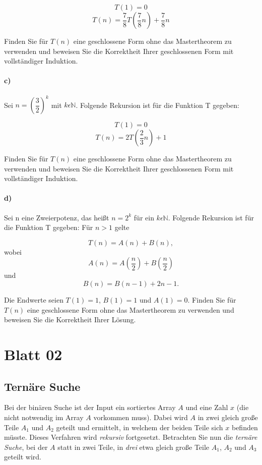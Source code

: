 \documentclass[paper=a4, fontsize=11pt]{scrartcl}
\numberwithin{equation}{section}
\numberwithin{figure}{section}
\numberwithin{table}{section}
\begin{document}
$$T(1)=0$$
$$T(n)= \dfrac{7}{8} T(\dfrac{7}{8} n) + \dfrac{7}{8} n$$

Finden Sie für $T(n)$ eine geschlossene Form ohne das Mastertheorem zu verwenden und beweisen Sie die Korrektheit Ihrer geschlossenen Form mit vollständiger Induktion.

\paragraph{c)}
Sei $n = (\dfrac{3}{2})^{k}$ mit $k \epsilon \mathbb{N}$. Folgende Rekursion ist für die Funktion T gegeben:

$$T(1)=0$$
$$T(n)= 2T ( \dfrac{2}{3} n) + 1$$

Finden Sie für $T(n)$ eine geschlossene Form ohne das Mastertheorem zu verwenden und beweisen Sie die Korrektheit Ihrer geschlossenen Form mit vollständiger Induktion.

\paragraph{d)}
Sei n eine Zweierpotenz, das heißt $n = 2^{k}$ für ein $k \epsilon \mathbb{N}$. Folgende Rekursion ist für die Funktion T gegeben: Für $n > 1$ gelte

$$T(n) = A(n) + B(n) ,$$ wobei
$$A(n)=A(\dfrac{n}{2}) + B( \dfrac{n}{2})$$ und
$$B(n)=B(n-1)

+2n-1.$$

Die Endwerte seien $T(1)=1$, $B(1)=1$ und $A(1)=0$. Finden Sie für $T(n)$ eine geschlossene Form ohne das Mastertheorem zu verwenden und beweisen Sie die Korrektheit Ihrer Lösung.

\newpage
\section{Blatt 02}
\subsection{Ternäre Suche}
Bei der binären Suche ist der Input ein sortiertes Array $A$ und eine Zahl $x$ (die nicht notwendig im Array $A$ vorkommen muss). Dabei wird $A$ in zwei gleich große Teile $A_1$ und $A_2$ geteilt und ermittelt, in welchem der beiden Teile sich $x$ befinden müsste. Dieses Verfahren wird \emph{rekursiv} fortgesetzt. Betrachten Sie nun die \emph{ternäre Suche}, bei der $A$ statt in zwei Teile, in \emph{drei} etwa gleich große Teile $A_1$, $A_2$ und $A_3$ geteilt wird.
\end{document}
